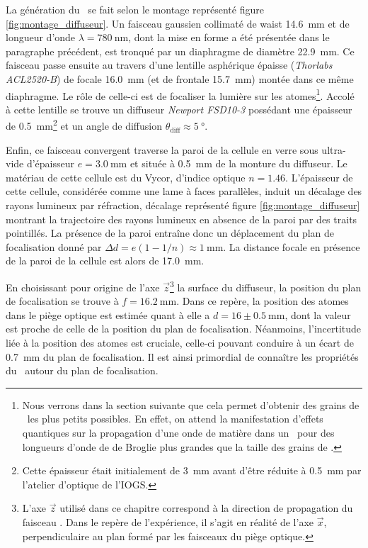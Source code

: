 La génération du \speckle\ se fait selon le montage représenté figure \ref{fig:montage_diffuseur}. Un faisceau gaussien collimaté de waist \SI{14.6}{\milli\metre} et de longueur d'onde $\lambda=\SI{780}{\nano\metre}$, dont la mise en forme a été présentée dans le paragraphe précédent, est tronqué par un diaphragme de diamètre \SI{22.9}{\milli\metre}. Ce faisceau passe ensuite au travers d'une lentille asphérique épaisse (\textit{Thorlabs ACL2520-B}) de focale \SI{16.0}{\milli\metre} (et de frontale \SI{15.7}{\milli\metre}) montée dans ce même diaphragme. Le rôle de celle-ci est de focaliser la lumière sur les atomes\footnote{Nous verrons dans la section suivante que cela permet d'obtenir des grains de \speckle\ les plus petits possibles. En effet, on attend la manifestation d'effets quantiques sur la propagation d'une onde de matière dans un \speckle\ pour des longueurs d'onde de de Broglie plus grandes que la taille des grains de \speckle .}. Accolé à cette lentille se trouve un diffuseur \textit{Newport FSD10-3} possédant une épaisseur de \SI{0.5}{\milli\metre}\footnote{Cette épaisseur était initialement de \SI{3}{\milli\metre} avant d'être réduite à \SI{0.5}{\milli\metre} par l'atelier d'optique de l'IOGS.} et un angle de diffusion $\theta_{\mathrm{diff}}\approx\SI{5}{\degree}$. 

Enfin, ce faisceau convergent traverse la paroi de la cellule en verre sous ultra-vide d'épaisseur $e=\SI{3.0}{\milli\metre}$ et située à \SI{0.5}{\milli\metre} de la monture du diffuseur. Le matériau de cette cellule est du Vycor, d'indice optique $n=1.46$. L'épaisseur de cette cellule, considérée comme une lame à faces parallèles, induit un décalage des rayons lumineux par réfraction, décalage représenté figure \ref{fig:montage_diffuseur} montrant la trajectoire des rayons lumineux en absence de la paroi par des traits pointillés. La présence de la paroi entraîne donc un déplacement du plan de focalisation donné par $\Delta d=e(1-1/n)\approx \SI{1}{\milli\metre}$. La distance focale en présence de la paroi de la cellule est alors de \SI{17.0}{\milli\metre}.


En choisissant pour origine de l'axe $\vec{z}$\footnote{L'axe $\vec{z}$ utilisé dans ce chapitre correspond à la direction de propagation du faisceau \speckle . Dans le repère de l'expérience, il s'agit en réalité de l'axe $\vec{x}$, perpendiculaire au plan formé par les faisceaux du piège optique.} la surface du diffuseur, la position du plan de focalisation se trouve à $f=\SI{16.2}{\milli\metre}$. Dans ce repère, la position des atomes dans le piège optique est estimée quant à elle a $d=16\pm\SI{0.5}{\milli\metre}$, dont la valeur est proche de celle de la position du plan de focalisation. Néanmoins, l'incertitude liée à la position des atomes est cruciale, celle-ci pouvant conduire à un écart de \SI{0.7}{\milli\metre} du plan de focalisation. Il est ainsi primordial de connaître les propriétés du \speckle\ autour du plan de focalisation. 


